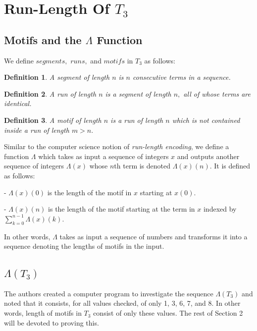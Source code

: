 \documentclass{article}
\newtheorem{definition}{Definition}[section]
\begin{document}
\section{Run-Length Of $T_3$}

\subsection{Motifs and the $\Lambda$ Function}
We define $segments,$ $runs,$ and $motifs$ in $T_3$ as follows:

\begin{definition}
\label{segment}
A \emph{segment} of length $n$ is $n$ consecutive terms in a sequence.
\end{definition}

\begin{definition}
\label{run}
A \emph{run} of length $n$ is a segment of length $n,$ all of whose terms are identical.
\end{definition}

\begin{definition}
\label{motif}
A \emph{motif} of length $n$ is a run of length $n$ which is not contained inside a run of length $m > n.$
\end{definition}

Similar to the computer science notion of \emph{run-length encoding}, we define a function $\Lambda$ which takes as input a sequence of integers $x$ and outputs another sequence of integers $\Lambda(x)$ whose $n$th term is denoted $\Lambda(x)(n).$ It is defined as follows:

- $\Lambda(x)(0)$ is the length of the motif in $x$ starting at $x(0).$

- $\Lambda(x)(n)$ is the length of the motif starting at the term in $x$ indexed by $\sum_{k=0}^{n-1} \Lambda(x)(k).$

In other words, $\Lambda$ takes as input a sequence of numbers and transforms it into a sequence denoting the lengths of motifs in the input.

\subsection{$\Lambda(T_3)$}

The authors created a computer program to investigate the sequence $\Lambda(T_3)$ and noted that it consists, for all values checked, of only 1, 3, 6, 7, and 8. In other words, length of motifs in $T_3$ consist of only these values. The rest of Section 2 will be devoted to proving this.
\end{document}
